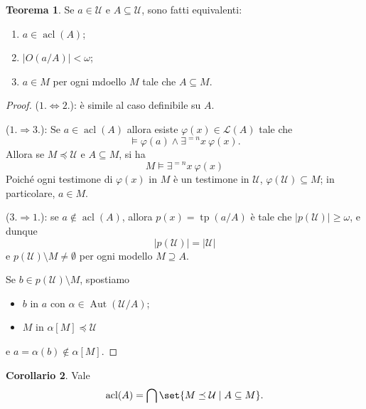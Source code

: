 \documentclass[10pt]{article}
\newcommand{\card}[1]{\left\vert #1 \right\vert}
\newcommand{\1}{\mathds{1}}
\theoremstyle{definition}%
\newtheorem{thm}{Teorema}[section]
\newtheorem{cor}[thm]{Corollario}
\theoremstyle{plain}
\theoremstyle{remark}
\begin{document}
\begin{thm}
Se \(a \in \mathcal{U}\) e \(A \subseteq \mathcal{U}\), sono fatti equivalenti:
\begin{enumerate}
\item \(a \in \operatorname{acl}(A)\);
\item \(\card{O(a/A)}<\omega\);
\item \(a \in M\) per ogni mdoello \(M\) tale che \(A \subseteq M\).
\end{enumerate}
\end{thm}
\begin{proof}
(\(1.\Leftrightarrow 2.\)): è simile al caso definibile su \(A\).

(\(1.\Rightarrow 3.\)): Se \(a \in \operatorname{acl}(A)\) allora esiste \(\varphi(x) \in \mathcal{L}(A)\) tale che
\begin{equation*}
\vDash \varphi(a) \land \exists^{=n} x\ \varphi(x).
\end{equation*}
Allora se \(M \preceq \mathcal{U}\) e \(A \subseteq M\), si ha
\begin{equation*}
M\vDash \exists^{=n} x\ \varphi(x)
\end{equation*}
Poiché ogni testimone di \(\varphi(x)\) in \(M\) è un testimone in \(\mathcal{U}\), \(\varphi(\mathcal{U}) \subseteq M\); in particolare, \(a \in M\).

(\(3.\Rightarrow 1.\)): se \(a\notin \operatorname{acl}(A)\), allora \(p(x) = \operatorname{tp}(a/A)\) è tale che \(\card{p(\mathcal{U})}\ge \omega\), e dunque
\begin{equation*}
\card{p(\mathcal{U})}=\card{\mathcal{U}}
\end{equation*}
e \(p(\mathcal{U})\setminus M\neq \emptyset\) per ogni modello \(M\supseteq A\).

Se \(b \in p(\mathcal{U})\setminus M\), spostiamo
\begin{itemize}
\item \(b\) in \(a\) con \(\alpha \in \operatorname{Aut}(\mathcal{U}/A)\);
\item \(M\) in \(\alpha[M] \preceq \mathcal{U}\)
\end{itemize}
e \(a=\alpha(b)\notin \alpha[M]\).
\end{proof}
\begin{cor}
Vale
\begin{equation*}
\operatorname{acl}(A)=\bigcap \set{M\preceq \mathcal{U}\mid A \subseteq M}.
\end{equation*}
\end{cor}
\end{document}
